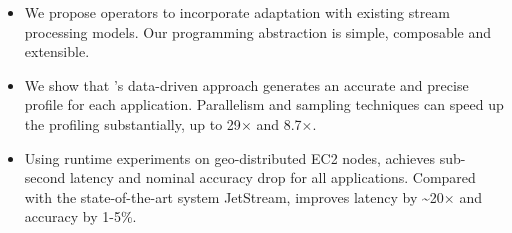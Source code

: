 \begin{itemize}[leftmargin=*, topsep=0pt, itemsep=-2pt]

\item We propose \maybe{} operators to incorporate adaptation with existing
  stream processing models. Our programming abstraction is simple, composable
  and extensible.

\item We show that \sysname{}'s data-driven approach generates an accurate and
  precise profile for each application. Parallelism and sampling techniques can
  speed up the profiling substantially, up to 29$\times$ and 8.7$\times$\@.

\item Using runtime experiments on geo-distributed EC2 nodes, \sysname{}
  achieves sub-second latency and nominal accuracy drop for all
  applications. Compared with the state-of-the-art system JetStream, \sysname{}
  improves latency by \textasciitilde 20$\times$ and accuracy by 1-5\%.

\end{itemize}


